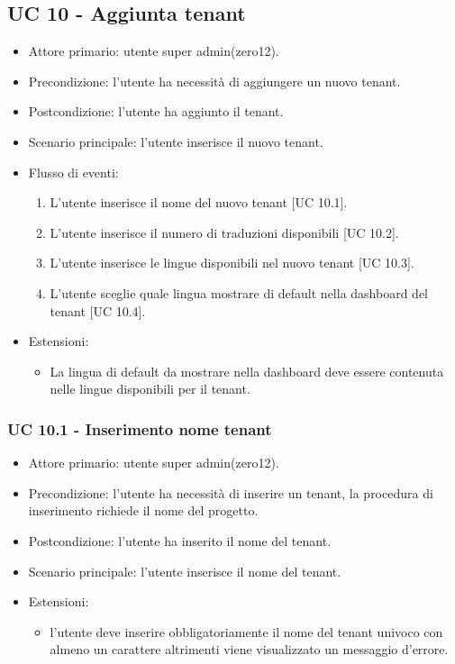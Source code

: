 \subsection{UC 10 - Aggiunta tenant}
    \begin{itemize}
        \item Attore primario: utente super admin(zero12).
        \item Precondizione: l'utente ha necessità di aggiungere un nuovo tenant.
        \item Postcondizione: l'utente ha aggiunto il tenant.
        \item Scenario principale: l'utente inserisce il nuovo tenant.
        \item Flusso di eventi:
        \begin{enumerate}
            \item L'utente inserisce il nome del nuovo tenant [UC 10.1].
            \item L'utente inserisce il numero di traduzioni disponibili [UC 10.2].
            \item L'utente inserisce le lingue disponibili nel nuovo tenant [UC 10.3].
            \item L'utente sceglie quale lingua mostrare di default nella dashboard del tenant [UC 10.4].
        \end{enumerate}
        \item Estensioni:
            \begin{itemize}
                \item La lingua di default da mostrare nella dashboard deve essere contenuta nelle lingue disponibili per il tenant.
            \end{itemize}
    \end{itemize}    
    \subsubsection{UC 10.1 - Inserimento nome tenant}
        \begin{itemize}
            \item Attore primario: utente super admin(zero12).
            \item Precondizione: l'utente ha necessità di inserire un tenant, la procedura di inserimento richiede il nome del progetto.
            \item Postcondizione: l'utente ha inserito il nome del tenant.
            \item Scenario principale: l'utente inserisce il nome del tenant.
            \item Estensioni: 
                \begin{itemize}
                    \item l'utente deve inserire obbligatoriamente il nome del tenant univoco con almeno un carattere altrimenti viene visualizzato un messaggio d'errore.
                \end{itemize}
        \end{itemize}
